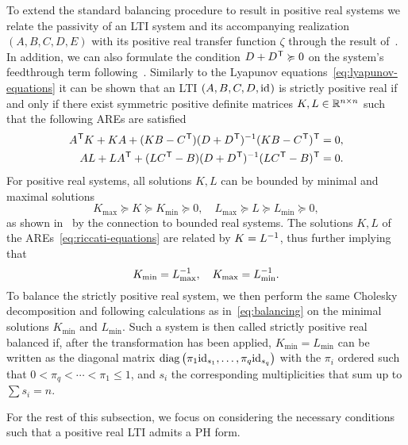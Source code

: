 To extend the standard balancing procedure to result in positive real systems we relate the passivity of an \ac{LTI} system and its accompanying realization $(A, B, C, D, E)$ with its positive real transfer function $\zeta$ through the result of~\cite[Corollary~2.7]{CGH2022}.
In addition, we can also formulate the condition $D + D\trans \succcurlyeq 0$ on the system's feedthrough term following~\cite[Definition~5]{Gugercin2007}.
Similarly to the Lyapunov equations~\eqref{eq:lyapunov-equations} it can be shown that an \ac{LTI} $(A, B, C, D, \id)$ is strictly positive real if and only if there exist symmetric positive definite matrices $K, L \in \bb{R}^{n \times n}$ such that the following \acp{ARE} are satisfied
\begin{equation}\label{eq:riccati-equations}
    \begin{aligned}
        A\trans K + K A + (K B - C\trans) (D + D\trans)\inv (K B - C\trans)\trans &= 0, \\
        A L + L A\trans + (L C\trans - B) (D + D\trans)\inv (L C\trans - B)\trans &= 0.
    \end{aligned}
\end{equation}
For positive real systems, all solutions $K, L$ can be bounded by minimal and maximal solutions
\begin{equation*}
    K_{\max} \succcurlyeq K \succcurlyeq K_{\min} \succcurlyeq 0,\quad L_{\max} \succcurlyeq L \succcurlyeq L_{\min} \succcurlyeq 0,
\end{equation*}
as shown in~\cite[Proposition~5.1]{Ober1991} by the connection to bounded real systems.
The solutions $K, L$ of the \acp{ARE}~\eqref{eq:riccati-equations} are related by $K = L\inv$, thus further implying that
\begin{equation*}
    K_{\min} = L_{\max}\inv,\quad K_{\max} = L_{\min}\inv.
\end{equation*}
To balance the strictly positive real system, we then perform the same Cholesky decomposition and following calculations as in~\eqref{eq:balancing} on the minimal solutions $K_{\min}$ and $L_{\min}$.
Such a system is then called strictly positive real balanced if, after the transformation has been applied, $K_{\min} = L_{\min}$ can be written as the diagonal matrix $\diag{\pi_1 \id[s_1], \dots, \pi_q \id[s_q]}$ with the $\pi_i$ ordered such that $0 < \pi_q < \cdots < \pi_1 \leq 1$, and $s_i$ the corresponding multiplicities that sum up to $\sum s_i = n$.

For the rest of this subsection, we focus on considering the necessary conditions such that a positive real \ac{LTI} admits a \ac{PH} form.

